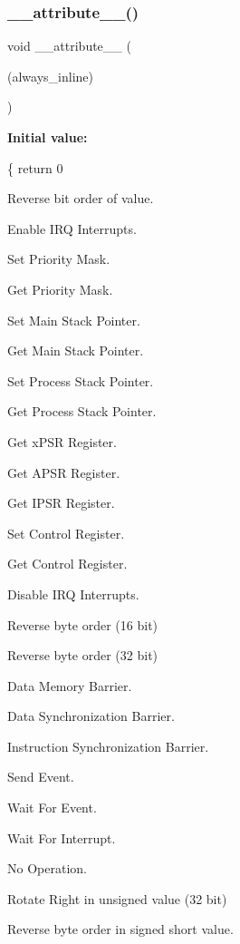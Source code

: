 \subsubsection{\texorpdfstring{\+\_\+\+\_\+attribute\+\_\+\+\_\+()}{\_\_attribute\_\_()}\hspace{0.1cm}{\footnotesize\ttfamily [3/3]}}
{\footnotesize\ttfamily void \+\_\+\+\_\+attribute\+\_\+\+\_\+ (\begin{DoxyParamCaption}\item[{(always\+\_\+inline)}]{ }\end{DoxyParamCaption})\hspace{0.3cm}{\ttfamily [inline]}}

{\bfseries Initial value\+:}
\begin{DoxyCode}
\{
    \textcolor{keywordflow}{return} 0
\end{DoxyCode}


Reverse bit order of value. 

Enable I\+RQ Interrupts.

Set Priority Mask.

Get Priority Mask.

Set Main Stack Pointer.

Get Main Stack Pointer.

Set Process Stack Pointer.

Get Process Stack Pointer.

Get x\+P\+SR Register.

Get A\+P\+SR Register.

Get I\+P\+SR Register.

Set Control Register.

Get Control Register.

Disable I\+RQ Interrupts.

Reverse byte order (16 bit)

Reverse byte order (32 bit)

Data Memory Barrier.

Data Synchronization Barrier.

Instruction Synchronization Barrier.

Send Event.

Wait For Event.

Wait For Interrupt.

No Operation.

Rotate Right in unsigned value (32 bit)

Reverse byte order in signed short value.

